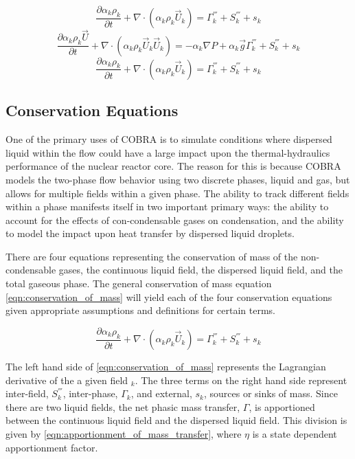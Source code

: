 \begin{equation}
\label{eqn:conservation_of_mass}
\frac{\partial \alpha_k \rho_k }{\partial t } + \nabla \cdot \left( \alpha_k \rho_k \vec{U}_k \right) = \Gamma^{'''}_k + S^{'''}_k + s_k
\end{equation}
\begin{equation}
\label{eqn:conservation_of_momentum}
\frac{\partial \alpha_k \rho_k \vec{U} }{\partial t } + \nabla \cdot \left( \alpha_k \rho_k \vec{U}_k \vec{U}_k \right) = -\alpha_k \nabla P + \alpha_k \vec{g} \Gamma^{'''}_k + S^{'''}_k + s_k
\end{equation}
\begin{equation}
\label{eqn:conservation_of_energy}
\frac{\partial \alpha_k \rho_k }{\partial t } + \nabla \cdot \left( \alpha_k \rho_k \vec{U}_k \right) = \Gamma^{'''}_k + S^{'''}_k + s_k
\end{equation}

\subsection{Conservation Equations}
One of the primary uses of COBRA is to simulate conditions where dispersed liquid within the flow could have a large impact upon the thermal-hydraulics performance of the nuclear reactor core.
The reason for this is because COBRA models the two-phase flow behavior using two discrete phases, liquid and gas, but allows for multiple fields within a given phase.
The ability to track different fields within a phase manifests itself in two important primary ways: the ability to account for the effects of con-condensable gases on condensation, and the ability to model the impact upon heat transfer by dispersed liquid droplets.


There are four equations representing the conservation of mass of the non-condensable gases, the continuous liquid field, the dispersed liquid field, and the total gaseous phase.
The general conservation of mass equation \eqref{eqn:conservation_of_mass} will yield each of the four conservation equations given appropriate assumptions and definitions for certain terms.

\begin{equation}
\label{eqn:conservation_of_mass}
\frac{\partial \alpha_k \rho_k }{\partial t } + \nabla \cdot \left( \alpha_k \rho_k \vec{U}_k \right) = \Gamma^{'''}_k + S^{'''}_k + s_k
\end{equation}

The left hand side of \eqref{eqn:conservation_of_mass} represents the Lagrangian derivative of the a given field $_k$.
The three terms on the right hand side represent inter-field, $S^{'''}_k$, inter-phase, $\Gamma_k$,  and external, $s_k$, sources or sinks of mass.
Since there are two liquid fields, the net phasic mass transfer, $\Gamma$, is apportioned between the continuous liquid field and the dispersed liquid field.
This division is given by \eqref{eqn:apportionment_of_mass_transfer}, where $\eta$ is a state dependent apportionment factor.

